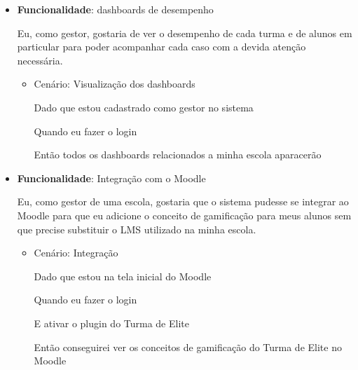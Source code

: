 \begin{itemize}
\item\textbf{Funcionalidade}: \glspl{dashboard} de desempenho
    
    Eu, como gestor, gostaria de ver o desempenho de cada turma e de alunos em particular para poder acompanhar cada caso com a devida atenção necessária.
    \begin{itemize}
        \item Cenário: Visualização dos dashboards 
        \par Dado que estou cadastrado como gestor no sistema
        \par Quando eu fazer o login
        \par Então todos os dashboards relacionados a minha escola aparacerão
    \end{itemize}   

\item\textbf{Funcionalidade}: Integração com o Moodle
    
    Eu, como gestor de uma escola, gostaria que o sistema pudesse se integrar ao Moodle para que eu adicione o conceito de gamificação para meus alunos sem que precise substituir o LMS utilizado na minha escola.
    \begin{itemize}
        \item Cenário: Integração 
        \par Dado que estou na tela inicial do Moodle
        \par Quando eu fazer o login 
        \par E ativar o plugin do Turma de Elite
        \par Então conseguirei ver os conceitos de gamificação do Turma de Elite no Moodle
    \end{itemize}  
\end{itemize} 

